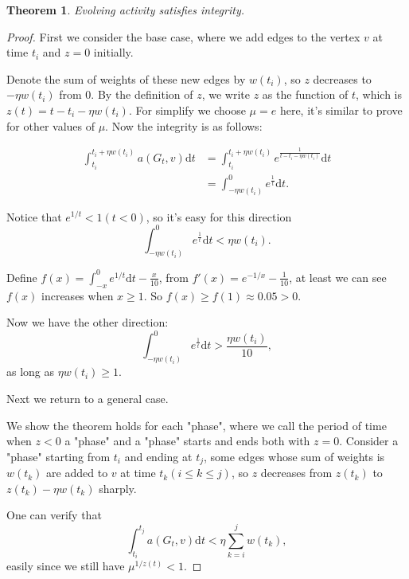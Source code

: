 \documentclass[12pt,abstract=true]{scrartcl}
\numberwithin{equation}{section}
\theoremstyle{definition}   \newtheorem{definition}{Definition}[section]
\theoremstyle{plain}        \newtheorem{theorem}{Theorem}[section]
\theoremstyle{plain}        \newtheorem{observation}{Observation}[section]
\theoremstyle{plain}        \newtheorem{fact}{Fact}[section]
\theoremstyle{plain}        \newtheorem{claim}{Claim}[section]
\theoremstyle{plain}        \newtheorem{lemma}[theorem]{Lemma}
\theoremstyle{plain}        \newtheorem{corollary}[theorem]{Corollary}
\theoremstyle{remark}       \newtheorem{example}{Example}[section]
\theoremstyle{remark}       \newtheorem{remark}{Remark}[section]
\begin{document}
\begin{theorem}
Evolving activity satisfies integrity.
\end{theorem}
\begin{proof}
First we consider the base case, where we add edges to the vertex $v$ at time $t_i$ and $z=0$ initially. 

Denote the sum of weights of these new edges by $w(t_i)$, so $z$ decreases to
$-\eta w(t_i)$ from 0. By the definition of $z$, we write $z$ as the function
of $t$, which is $z(t)=t-t_i-\eta w(t_i)$. For simplify we choose $\mu=e$ here,
it's similar to prove for other values of $\mu$. Now the integrity is as
follows:

\begin{equation}
\begin{split}
\int_{t_i}^{t_i+\eta w(t_i)} a(G_t,v) \mathrm{d}t &= \int_{t_i}^{t_i+\eta
w(t_i)} e^{\frac{1}{t-t_i-\eta w(t_i)}} \mathrm{d}t \\
&= \int_{-\eta w(t_i)}^{0} e^{\frac{1}{t}} \mathrm{d}t.
\end{split}
\end{equation}

Notice that $e^{1/t}<1(t<0)$, so it's easy for this direction
\begin{equation}
\int_{-\eta w(t_i)}^{0} e^{\frac{1}{t}} \mathrm{d}t< \eta w(t_i).
\end{equation}

Define $f(x)=\int_{-x}^{0} e^{1/t} \mathrm{d}t - \frac{x}{10}$, from
$f'(x)=e^{-1/x}-\frac{1}{10}$, at least we can see $f(x)$ increases when $x\ge
1$. So $f(x)\ge f(1)\approx 0.05>0$.

Now we have the other direction: 
\begin{equation}
\int_{-\eta w(t_i)}^{0} e^{\frac{1}{t}} \mathrm{d}t>\frac{\eta w(t_i)}{10},
\end{equation}
as long as $\eta w(t_i)\ge 1$.

Next we return to a general case. 

We show the theorem holds for each "phase", where we call the period of time
when $z<0$ a "phase" and a "phase" starts and ends both with $z=0$. Consider a
"phase" starting from $t_i$ and ending at $t_j$, some edges whose sum of
weights is $w(t_k)$ are added to $v$ at time $t_k(i\le k\le j)$, so $z$
decreases from $z(t_k)$ to $z(t_k)-\eta w(t_k)$ sharply.

One can verify that
\begin{equation}
\int_{t_i}^{t_j} a(G_t,v) \mathrm{d}t< \eta \sum_{k=i}^j w(t_k),
\end{equation}
easily since we still have $\mu^{1/z(t)}<1$.


\end{proof}
\end{document}

